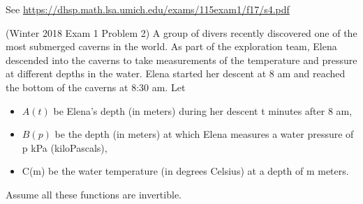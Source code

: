 \documentclass[11pt]{exam}
\begin{document}
\begin{questions}
      \begin{solution}
        See \href{https://dhsp.math.lsa.umich.edu/exams/115exam1/f17/s4.pdf}{https://dhsp.math.lsa.umich.edu/exams/115exam1/f17/s4.pdf}
      \end{solution}
      \vspace{0.5in}
      \pagebreak
    \question (Winter 2018 Exam 1 Problem 2)
A group of divers recently discovered one of the most submerged caverns in the world. As part of the exploration team, Elena descended into the caverns to take measurements of the temperature and pressure at different depths in the water. Elena started her descent at 8 am and reached the bottom of the caverns at 8:30 am. Let
\vspace{-.05in}
\begin{itemize}
\item $A(t)$ be Elena's depth (in meters) during her descent t minutes after 8 am,
\item $B(p)$ be the depth (in meters) at which Elena measures a water pressure of p kPa
(kiloPascals),
\item C(m) be the water temperature (in degrees Celsius) at a depth of m meters.
\end{itemize}
\vspace{-.05in}
Assume all these functions are invertible.
\end{questions}
\end{document}
